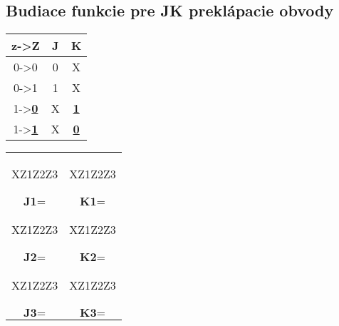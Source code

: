 \documentclass{article}
\begin{document}
\subsection{Budiace funkcie pre JK preklápacie obvody}
\begin{table}[h]
\centering
\begin{tabular}{|c|c|c|}\cline{2-3}
\multicolumn{1}{c|}{z->Z}		&J	&K \\ \hline
0->0					&0	&X \\ \hline
0->1					&1	&X \\ \hline
1->\textbf{\underline{0}}		&X 	&\textbf{\underline{1}} \\ \hline
1->\textbf{\underline{1}}		&X 	&\textbf{\underline{0}} \\ \hline
\end{tabular}
\end{table}
\begin{longtable}{c c}
\begin{Karnaugh}{XZ1}{Z2Z3}
\contingut{}
\end{Karnaugh}
&
\begin{Karnaugh}{XZ1}{Z2Z3}
\contingut{}
\end{Karnaugh}
\\
$\textbf{J1}=$&$\textbf{K1}=$\\
\begin{Karnaugh}{XZ1}{Z2Z3}
\contingut{}
\end{Karnaugh}
&
\begin{Karnaugh}{XZ1}{Z2Z3}
\contingut{}
\end{Karnaugh}
\\
$\textbf{J2}=$&$\textbf{K2}=$\\
\begin{Karnaugh}{XZ1}{Z2Z3}
\contingut{}
\end{Karnaugh}
&
\begin{Karnaugh}{XZ1}{Z2Z3}
\contingut{}
\end{Karnaugh}
\\
$\textbf{J3}=$&$\textbf{K3}=$\\
\end{longtable}
\end{document}
